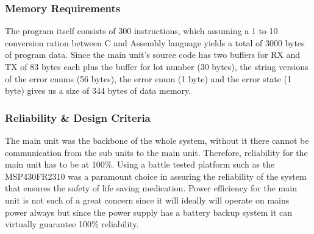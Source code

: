 \subsubsection{Memory Requirements}
The program itself consists of 300 instructions, which assuming a 1 to 10 conversion ration between C and Assembly language yields a total of 3000 bytes of program data. Since the main unit's source code has two buffers for RX and TX of 83 bytes each plus the buffer for lot number (30 bytes), the string versions of the error enums (56 bytes), the error enum (1 byte) and the error state (1 byte) gives us a size of 344 bytes of data memory.
\subsubsection{Reliability \& Design Criteria}
The main unit was the backbone of the whole system, without it there cannot be communication from the sub units to the main unit. Therefore, reliability for the main unit has to be at 100\%. Using a battle tested platform such as the MSP430FR2310 was a paramount choice in assuring the reliability of the system that ensures the safety of life saving medication. Power efficiency for the main unit is not such of a great concern since it will ideally will operate on mains power always but since the power supply has a battery backup system it can virtually guarantee 100\% reliability.

